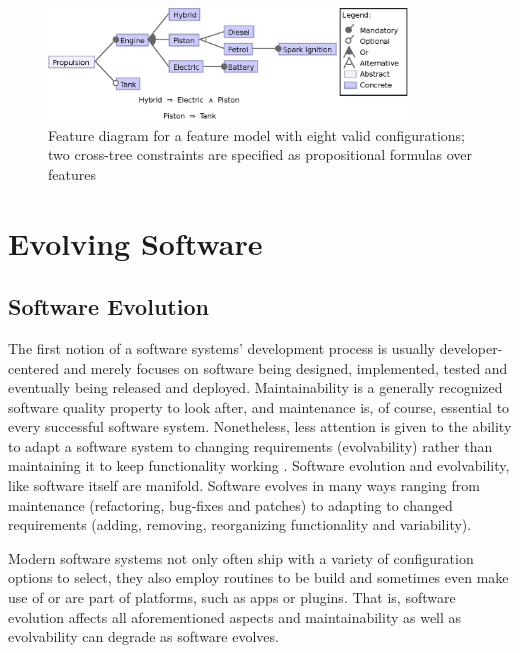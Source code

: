 \begin{figure}[htbp]
  \centering
  
  	\includegraphics[width=0.85\textwidth]{images/introduction_fm.eps}
  \caption{Feature diagram for a feature model with eight valid configurations;
  two cross-tree constraints are specified as propositional formulas over
  features}
  \label{fig:introduction_fm}
\end{figure}

\section{Evolving Software} \label{sec:2.1}
\subsection{Software Evolution}
The first notion of a software systems' development process is usually
developer-centered and merely focuses on software being designed, implemented,
tested and eventually being released and deployed. Maintainability is a
generally recognized software quality property to look after, and maintenance
is, of course, essential to every successful software system. Nonetheless, less
attention is given to the ability to adapt a software system to changing
requirements (evolvability) rather than maintaining it to keep functionality
working \citep{parnas_software_1994}. Software evolution and evolvability, like
software itself are manifold. Software evolves in many ways ranging from maintenance (refactoring,
bug-fixes and patches) to adapting to changed requirements (adding, removing,
reorganizing functionality and variability).

Modern software systems not only often ship with a variety of configuration
options to select, they also employ routines to be build and sometimes even
make use of or are part of platforms, such as apps or plugins. That is,
software evolution affects all aforementioned aspects and maintainability as
well as evolvability can degrade as software evolves.

